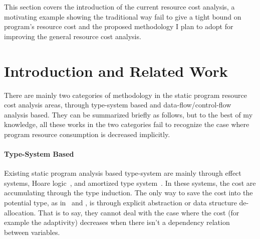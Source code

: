 This section covers the introduction of the current resource cost analysis, a 
motivating example showing the traditional way fail to give a tight bound on program's resource cost 
and the proposed methodology I plan to adopt for improving the general resource cost analysis.
\section{Introduction and Related Work}
\label{sec:generalcost-backgroung}
There are mainly two categories of methodology in the static program resource cost analysis areas, 
through type-system based  and data-flow/control-flow analysis based. 
They can be summarized briefly as follows, but to the best of my knowledge,
all these works in the two categories fail to recognize the case where program resource consumption is decreased implicitly.
 \paragraph*{Type-System Based}
Existing
static program analysis based type-system are mainly through 
effect systems, 
Hoare logic~\cite{gaboardi2021graded}, and amortized type system~\cite{hoffmann_jost_2022}.
%
In these systems, the cost are accumulating through the type induction. 
The only way to save the cost into the potential
type, as in~\cite{GustafssonEL05} and \cite{hoffmann_jost_2022}, 
is through explicit abstraction or data structure de-allocation.
That is to say, they cannot deal with the case where the cost (for example the adaptivity) decreases when there isn't a dependency relation between variables.
